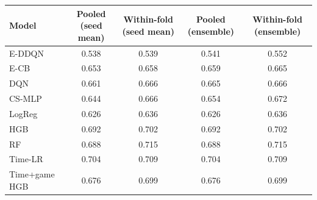 \begin{tabular}{lcccc}
\toprule
Model & Pooled (seed mean) & Within-fold (seed mean) & Pooled (ensemble) & Within-fold (ensemble) \\
\midrule
E-DDQN & 0.538 & 0.539 & 0.541 & 0.552 \\
E-CB & 0.653 & 0.658 & 0.659 & 0.665 \\
DQN & 0.661 & 0.666 & 0.665 & 0.666 \\
CS-MLP & 0.644 & 0.666 & 0.654 & 0.672 \\
LogReg & 0.626 & 0.636 & 0.626 & 0.636 \\
HGB & 0.692 & 0.702 & 0.692 & 0.702 \\
RF & 0.688 & 0.715 & 0.688 & 0.715 \\
Time-LR & 0.704 & 0.709 & 0.704 & 0.709 \\
Time+game HGB & 0.676 & 0.699 & 0.676 & 0.699 \\
\bottomrule
\end{tabular}
